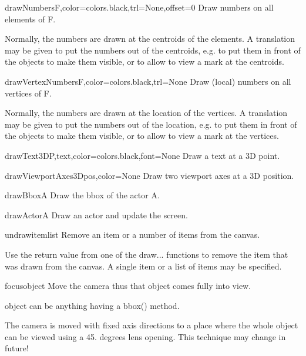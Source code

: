 \begin{funcdesc}{drawNumbers}{F,color=colors.black,trl=None,offset=0}
Draw numbers on all elements of F.

Normally, the numbers are drawn at the centroids of the elements.
A translation may be given to put the numbers out of the centroids,
e.g. to put them in front of the objects to make them visible,
or to allow to view a mark at the centroids.

\end{funcdesc}

\begin{funcdesc}{drawVertexNumbers}{F,color=colors.black,trl=None}
Draw (local) numbers on all vertices of F.

Normally, the numbers are drawn at the location of the vertices.
A translation may be given to put the numbers out of the location,
e.g. to put them in front of the objects to make them visible,
or to allow to view a mark at the vertices.

\end{funcdesc}

\begin{funcdesc}{drawText3D}{P,text,color=colors.black,font=None}
Draw a text at a 3D point.
\end{funcdesc}

\begin{funcdesc}{drawViewportAxes3D}{pos,color=None}
Draw two viewport axes at a 3D position.
\end{funcdesc}

\begin{funcdesc}{drawBbox}{A}
Draw the bbox of the actor A.
\end{funcdesc}

\begin{funcdesc}{drawActor}{A}
Draw an actor and update the screen.
\end{funcdesc}

\begin{funcdesc}{undraw}{itemlist}
Remove an item or a number of items from the canvas.

Use the return value from one of the draw... functions to remove
the item that was drawn from the canvas.
A single item or a list of items may be specified.

\end{funcdesc}

\begin{funcdesc}{focus}{object}
Move the camera thus that object comes fully into view.

object can be anything having a bbox() method.

The camera is moved with fixed axis directions to a place
where the whole object can be viewed using a 45. degrees lens opening.
This technique may change in future!

\end{funcdesc}

